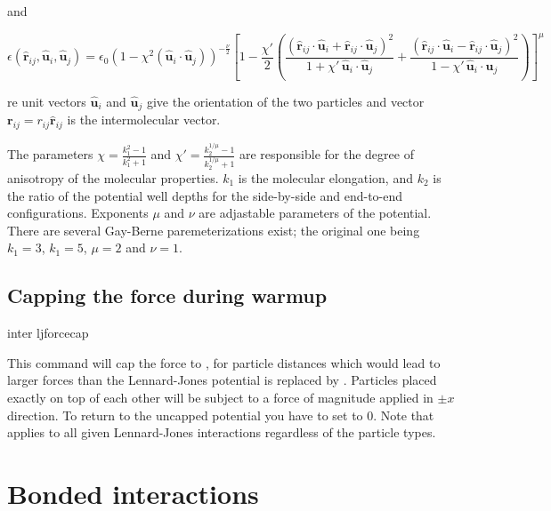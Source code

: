 and

\[ \epsilon(\mathbf{\hat{r}}_{ij}, \mathbf{\hat{u}}_i,
\mathbf{\hat{u}}_j) = \epsilon_0 \left( 1- \chi^{2}(\mathbf{\hat{u}}_i
  \cdot \mathbf{\hat{u}}_j) \right)^{-\frac {\nu}{2}} \left[1-\frac
  {\chi'}{2} \left( \frac { (\mathbf{\hat{r}}_{ij} \cdot
      \mathbf{\hat{u}}_i+ \mathbf{\hat{r}}_{ij} \cdot
      \mathbf{\hat{u}}_j)^{2}} {1+\chi' \, \mathbf{\hat{u}}_i \cdot
      \mathbf{\hat{u}}_j }+ \frac {(\mathbf{\hat{r}}_{ij} \cdot
      \mathbf{\hat{u}}_i-\mathbf{\hat{r}}_{ij} \cdot
      \mathbf{\hat{u}}_j)^{2}} {1-\chi' \, \mathbf{\hat{u}}_i \cdot
      \mathbf{\hat{u}}_j } \right) \right]^{\mu} \]

re unit vectors $ \mathbf{\hat{u}}_i $ and $ \mathbf{\hat{u}}_j $ give
the orientation of the two particles and vector $ \mathbf{r}_{ij} =
r_{ij} \mathbf{\hat{r}}_{ij} $ is the intermolecular vector.

The parameters $ \chi = \frac{k_1^{2} - 1}{k_1^{2} + 1 } $ and $ \chi'
= \frac{k_2^{1/\mu} - 1}{k_2^{1/\mu} + 1 } $ are responsible for the
degree of anisotropy of the molecular properties. $ k_1 $ is the
molecular elongation, and $ k_2 $ is the ratio of the potential well
depths for the side-by-side and end-to-end configurations. Exponents $
\mu $ and $ \nu $ are adjastable parameters of the potential. There
are several Gay-Berne paremeterizations exist; the original one being
$ k_1 = 3 $, $ k_1 = 5 $, $ \mu = 2 $ and $ \nu = 1 $.

\subsection{Capping the force during warmup}

\begin{essyntax}
  inter ljforcecap 
\end{essyntax}

This command will cap the force to , \ie for particle
distances which would lead to larger forces than  the
Lennard-Jones potential is replaced by . Particles
placed exactly on top of each other will be subject to a force of
magnitude  applied in $\pm x$ direction. To return to
the uncapped potential you have to set  to $0$.  Note
that  applies to all given Lennard-Jones
interactions regardless of the particle types.

\section{Bonded interactions}
\label{sec:inter-bonded}

